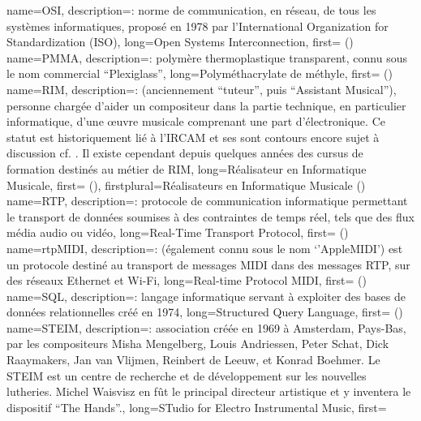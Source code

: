 {
    name={OSI},
    description={\textit{}: norme de communication, en réseau, de tous les systèmes informatiques, proposé en 1978 par l'International Organization for Standardization (ISO)},
    long={Open Systems Interconnection},
    first={ ()}
}
{
    name={PMMA},
    description={\textit{}: polymère thermoplastique transparent, connu sous le nom commercial ``Plexiglass''},
    long={Polyméthacrylate de méthyle},
    first={ ()}
}
{
    name={RIM},
    description={\textit{}: (anciennement ``tuteur'', puis ``Assistant Musical''), personne chargée d'aider un compositeur dans la partie technique, en particulier informatique, d'une œuvre musicale comprenant une part d'électronique. Ce statut est historiquement lié à l'\gls{IRCAM} et ses sont contours encore sujet à discussion cf. \cite{zattra_les_2013}. Il existe cependant depuis quelques années des cursus de formation destinés au métier de RIM},
    long={Réalisateur en Informatique Musicale},
    first={ ()},
    firstplural={Réalisateurs en Informatique Musicale (\glspluralsuffix)}
}
{
    name={RTP},
    description={\textit{}: protocole de communication informatique permettant le transport de données soumises à des contraintes de temps réel, tels que des flux média audio ou vidéo},
    long={Real-Time Transport Protocol},
    first={ ()}
}
{
    name={rtpMIDI},
    description={\textit{}: (également connu sous le nom `'AppleMIDI') est un protocole destiné au transport de messages MIDI dans des messages \gls{RTP}, sur des réseaux Ethernet et Wi-Fi},
    long={Real-time Protocol MIDI},
    first={ ()}
}
{
    name={SQL},
    description={\textit{}: langage informatique servant à exploiter des bases de données relationnelles créé en 1974},
    long={Structured Query Language},
    first={ ()}
}
{
    name={STEIM},
    description={\textit{}: association créée en 1969 à Amsterdam, Pays-Bas, par les compositeurs Misha Mengelberg, Louis Andriessen, Peter Schat, Dick Raaymakers, Jan van Vlijmen, Reinbert de Leeuw, et Konrad Boehmer. Le STEIM est un centre de recherche et de développement sur les nouvelles lutheries. Michel Waisvisz en fût le principal directeur artistique et y inventera le dispositif ``The Hands''.},
    long={STudio for Electro Instrumental Music},
    first={}
}
